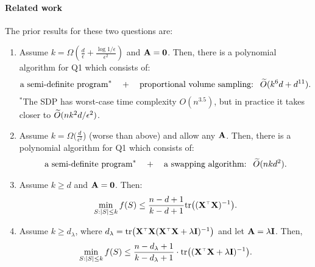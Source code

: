 \documentclass[12pt]{sty/colt2019/colt2018-arxiv}
\begin{document}
\paragraph{Related work} The prior results for these two questions are:
\begin{enumerate}
  \item \citep{proportional-volume-sampling} Assume $k=\Omega(\frac d\epsilon +
    \frac{\log1/\epsilon}{\epsilon^2})$ and $\mathbf A=\mathbf 0$.
    Then, there is a polynomial algorithm for Q1 which consists of:
    \begin{align*}
\text{a semi-definite program}^*\quad+\quad \text{proportional volume
      sampling: }\ \widetilde{O}(k^6d + d^{11}).
    \end{align*}
    $^*$The SDP has worst-case time complexity $O(n^{3.5})$, but in
    practice it takes closer to $\widetilde{O}(nk^2d/\epsilon^2)$.
    \item \cite{near-optimal-design} Assume $k=\Omega(\frac
      d{\epsilon^2}$) (worse than above) and allow any $\mathbf A$. Then,
      there is a polynomial algorithm for Q1 which consists of: 
    \begin{align*}
\text{a semi-definite program}^*\quad+\quad \text{a
      swapping algorithm: }\ \widetilde{O}(nkd^2).
    \end{align*}
  \item \cite{avron-boutsidis13} Assume $k\geq d$ and
    $\mathbf A=\mathbf 0$. Then:
    \begin{align*}
      \min_{S:|S|\leq k}f(S)\leq  \frac{n-d+1}{k-d+1} \tr\big((\X^\top\X)^{-1}\big).
    \end{align*}
  \item \cite{regularized-volume-sampling} Assume $k\geq d_{\lambda}$,
    where $d_{\lambda}=\tr\big(\X^\top\X(\X^\top\X+\lambda\I)^{-1}\big)$ and let
    $\mathbf A=\lambda\mathbf I$. Then,
    \begin{align*}
      \min_{S:|S|\leq k}f(S)\leq \frac{n-d_{\lambda}+1}{k-d_{\lambda}+1}\cdot \tr\big((\X^\top\X+\lambda\I)^{-1}\big).
    \end{align*}
  \end{enumerate}
\vspace{3mm}
  
\end{document}
